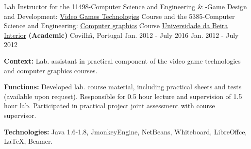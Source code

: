 \begin{cventries}
  \cventry
    {Lab Instructor for the
        11498-Computer Science and Engineering \& -Game Design and Development: 
		\href{http://www.di.ubi.pt/~agomes/tjv/}{Video Games Technologies}	Course 
		\linebreak and the
		5385-Computer Science and Engineering: 		
		\href{http://www.di.ubi.pt/~agomes/cg/}{Computer graphics} Course} %
    {\href{http://www.ubi.pt}{Universidade da Beira Interior} \textbf{(Academic)}} %
    {Covilh\~a, Portugal} %
    {\linebreak Jan. 2012 - July 2016 \linebreak Jan. 2012 - July 2012} %
    {
      \begin{cvitems} %
		\item {\textbf{Context:} Lab. assistant in practical component of the video game technologies and computer graphics courses.}
		\item {\textbf{Functions:} Developed lab. course material, including practical sheets and tests (available upon request). Responsible for 0.5 hour lecture and supervision of 1.5 hour lab. Participated in practical project joint assessment with course supervisor.}
		\item {\textbf{Technologies:} Java 1.6-1.8, JmonkeyEngine, NetBeans, Whiteboard, LibreOffce, LaTeX, Beamer.} %
      \end{cvitems}
    }       
    

\end{cventries}
